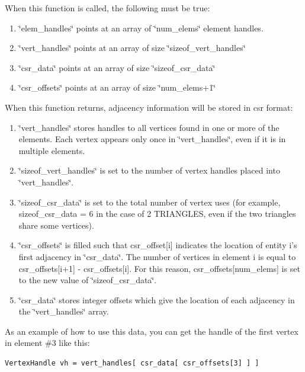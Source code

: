 \documentclass[letter]{report}
\begin{document}
When this function is called, the following must be true:\begin{enumerate}
\item 
\char`\"{}elem\_\-handles\char`\"{} points at an array of \char`\"{}num\_\-elems\char`\"{} element handles.\item 
\char`\"{}vert\_\-handles\char`\"{} points at an array of size \char`\"{}sizeof\_\-vert\_\-handles\char`\"{}\item 
\char`\"{}csr\_\-data\char`\"{} points at an array of size \char`\"{}sizeof\_\-csr\_\-data\char`\"{}\item 
\char`\"{}csr\_\-offsets\char`\"{} points at an array of size \char`\"{}num\_\-elems+1\char`\"{}\end{enumerate}
When this function returns, adjacency information will be stored in csr format:\begin{enumerate}
\item 
\char`\"{}vert\_\-handles\char`\"{} stores handles to all vertices found in one or more of the elements. Each vertex appears only once in \char`\"{}vert\_\-handles\char`\"{}, even if it is in multiple elements.\item 
\char`\"{}sizeof\_\-vert\_\-handles\char`\"{} is set to the number of vertex handles placed into \char`\"{}vert\_\-handles\char`\"{}.\item 
\char`\"{}sizeof\_\-csr\_\-data\char`\"{} is set to the total number of vertex uses (for example, sizeof\_\-csr\_\-data = 6 in the case of 2 TRIANGLES, even if the two triangles share some vertices).\item 
\char`\"{}csr\_\-offsets\char`\"{} is filled such that csr\_\-offset[i] indicates the location of entity i's first adjacency in \char`\"{}csr\_\-data\char`\"{}. The number of vertices in element i is equal to csr\_\-offsets[i+1] - csr\_\-offsets[i]. For this reason, csr\_\-offsets[num\_\-elems] is set to the new value of \char`\"{}sizeof\_\-csr\_\-data\char`\"{}.\item 
\char`\"{}csr\_\-data\char`\"{} stores integer offsets which give the location of each adjacency in the \char`\"{}vert\_\-handles\char`\"{} array.\end{enumerate}
As an example of how to use this data, you can get the handle of the first vertex in element \#3 like this: 

\footnotesize\begin{verbatim}VertexHandle vh = vert_handles[ csr_data[ csr_offsets[3] ] ] 
\end{verbatim}\normalsize 
\end{document}
